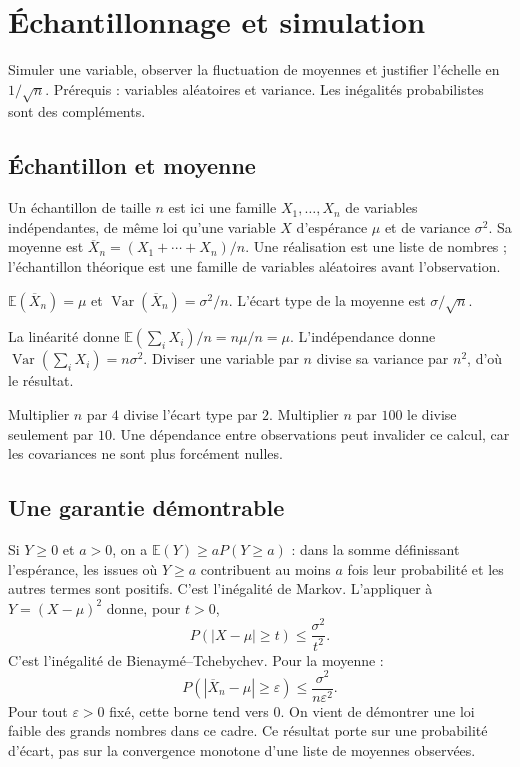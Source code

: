 \documentclass[../cours_1re.tex]{subfiles}
\begin{document}
\setcounter{chapter}{22}
\chapter{Échantillonnage et simulation}
\label{ch:23}
\begin{objectif}
Simuler une variable, observer la fluctuation de moyennes et justifier l'échelle en $1/\sqrt n$.
Prérequis : variables aléatoires et variance. Les inégalités probabilistes sont des compléments.
\end{objectif}
\section{Échantillon et moyenne}
Un échantillon de taille $n$ est ici une famille $X_1,\ldots,X_n$ de variables
indépendantes, de même loi qu'une variable $X$ d'espérance $\mu$ et de
variance $\sigma^2$. Sa moyenne est $\overline X_n=(X_1+\cdots+X_n)/n$.
Une réalisation est une liste de nombres ; l'échantillon théorique est une
famille de variables aléatoires avant l'observation.
\begin{propriete}
$\mathbb E(\overline X_n)=\mu$ et
$\operatorname{Var}(\overline X_n)=\sigma^2/n$.
L'écart type de la moyenne est $\sigma/\sqrt n$.
\end{propriete}
\begin{demonstration}
La linéarité donne $\mathbb E(\sum_iX_i)/n=n\mu/n=\mu$.
L'indépendance donne $\operatorname{Var}(\sum_iX_i)=n\sigma^2$.
Diviser une variable par $n$ divise sa variance par $n^2$, d'où le résultat.
\end{demonstration}
Multiplier $n$ par $4$ divise l'écart type par $2$. Multiplier $n$ par $100$
le divise seulement par $10$. Une dépendance entre observations peut invalider
ce calcul, car les covariances ne sont plus forcément nulles.

\section{Une garantie démontrable}
\approfondissement
Si $Y\ge0$ et $a>0$, on a
$\mathbb E(Y)\ge aP(Y\ge a)$ : dans la somme définissant l'espérance,
les issues où $Y\ge a$ contribuent au moins $a$ fois leur probabilité
et les autres termes sont positifs. C'est l'inégalité de Markov.
L'appliquer à $Y=(X-\mu)^2$ donne, pour $t>0$,
\[
P(|X-\mu|\ge t)\le\frac{\sigma^2}{t^2}.
\]
C'est l'inégalité de Bienaymé--Tchebychev. Pour la moyenne :
\[
P(|\overline X_n-\mu|\ge\varepsilon)
\le \frac{\sigma^2}{n\varepsilon^2}.
\]
Pour tout $\varepsilon>0$ fixé, cette borne tend vers $0$.
On vient de démontrer une loi faible des grands nombres dans ce cadre.
Ce résultat porte sur une probabilité d'écart, pas sur la convergence
monotone d'une liste de moyennes observées.
\end{document}
